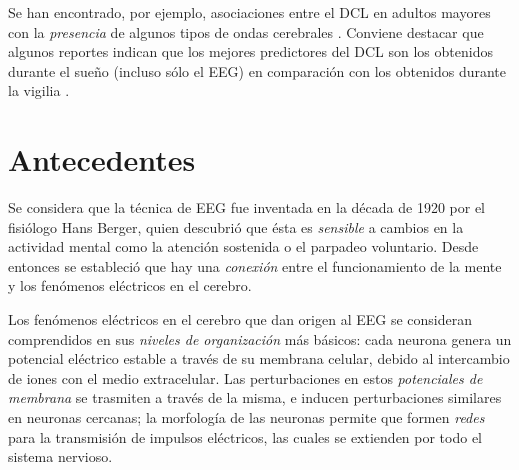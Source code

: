 \documentclass[12pt,letterpaper]{book}
\begin{document}
Se han encontrado, por ejemplo, asociaciones entre el DCL en adultos mayores con la \textit{presencia} de algunos tipos de ondas cerebrales \cite{babiloni13,prichep06,prichep94}.
%
Conviene destacar que algunos reportes indican que los mejores predictores del DCL son los obtenidos durante el sueño (incluso sólo el EEG) en comparación con los obtenidos durante la vigilia \cite{Brayet16}.


\section*{Antecedentes}

Se considera que la técnica de EEG fue inventada en la década de 1920 por el fisiólogo Hans Berger, quien descubrió que ésta es \textit{sensible} a cambios en la actividad mental como la atención sostenida o el parpadeo voluntario.
%
Desde entonces se estableció que hay una \textit{conexión} entre el funcionamiento de la mente y los fenómenos eléctricos en el cerebro.
%

Los fenómenos eléctricos en el cerebro que dan origen al EEG se consideran comprendidos en sus \textit{niveles de organización} más básicos: cada neurona genera un potencial eléctrico estable a través de su membrana celular, debido al intercambio de iones con el medio extracelular.
%
Las perturbaciones en estos \textit{potenciales de membrana} se trasmiten a través de la misma, e inducen perturbaciones similares en neuronas cercanas; la morfología de las neuronas permite que formen \textit{redes} para la transmisión de impulsos eléctricos, las cuales se extienden por todo el sistema nervioso.
%
%
\end{document}
